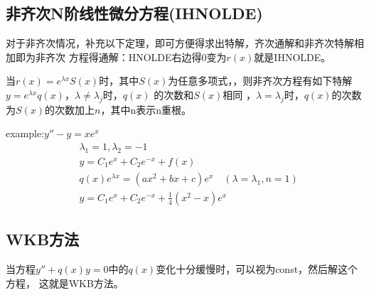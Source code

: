 \documentclass[UTF8]{article}
\begin{document}
\subsection{非齐次N阶线性微分方程(IHNOLDE)}
对于非齐次情况，补充以下定理，即可方便得求出特解，齐次通解和非齐次特解相加即为非齐次
方程得通解：HNOLDE右边得0变为$r(x)$就是IHNOLDE。

当$r(x)=e^{\lambda x}S(x)$时，其中$S(x)$为任意多项式，，则非齐次方程有如下特解
$y = e^{\lambda x} q(x)$，$\lambda \neq \lambda_j$时，$q(x)$ 的次数和$S(x)$相同
，$\lambda=\lambda_j$时，$q(x)$的次数为$S(x)$的次数加上$n$，其中n表示n重根。

example:$y''-y=xe^x$
\begin{align*}
     & \lambda_1 = 1,\lambda_2=-1                                       \\
     & y = C_1e^x+C_2e^{-x}+f(x)                                        \\
     & q(x)e^{\lambda x} = (ax^2+bx+c)e^x\quad (\lambda=\lambda_1, n=1) \\
     & y = C_1 e^x+C_2 e^{-x}+\frac{1}{4}(x^2-x)e^x
\end{align*}
\subsection{WKB方法}
当方程$y''+q(x)y=0$中的$q(x)$变化十分缓慢时，可以视为const，然后解这个方程，
这就是WKB方法。
\end{document}
